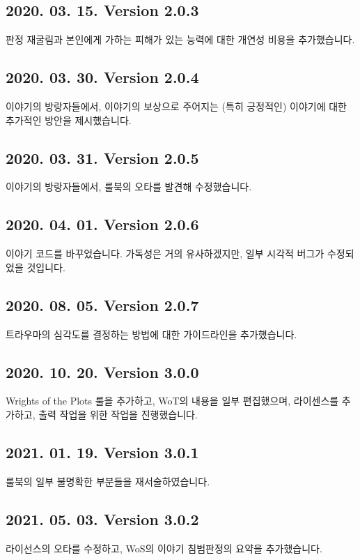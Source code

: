 \documentclass{report}
\begin{document}
	\subsection*{2020. 03. 15. Version 2.0.3}
	판정 재굴림과 본인에게 가하는 피해가 있는 능력에 대한 개연성 비용을 추가했습니다.
	
	\subsection*{2020. 03. 30. Version 2.0.4}
	이야기의 방랑자들에서, 이야기의 보상으로 주어지는 (특히 긍정적인) 이야기에 대한 추가적인 방안을 제시했습니다.
	
	\subsection*{2020. 03. 31. Version 2.0.5}
	이야기의 방랑자들에서, 룰북의 오타를 발견해 수정했습니다.
	
	\subsection*{2020. 04. 01. Version 2.0.6}
	이야기 코드를 바꾸었습니다. 가독성은 거의 유사하겠지만, 일부 시각적 버그가 수정되었을 것입니다.
	
	\subsection*{2020. 08. 05. Version 2.0.7}
	트라우마의 심각도를 결정하는 방법에 대한 가이드라인을 추가했습니다.

	\subsection*{2020. 10. 20. Version 3.0.0}
	Wrights of the Plots 룰을 추가하고, WoT의 내용을 일부 편집했으며, 라이센스를 추가하고, 출력 작업을 위한 작업을 진행했습니다.

	\subsection*{2021. 01. 19. Version 3.0.1}
	룰북의 일부 불명확한 부분들을 재서술하였습니다.

	\subsection*{2021. 05. 03. Version 3.0.2}
	라이선스의 오타를 수정하고, WoS의 이야기 침범판정의 요약을 추가했습니다.
	
\end{document}
